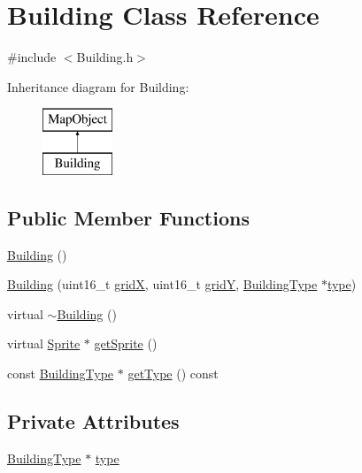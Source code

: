 \hypertarget{class_building}{}\section{Building Class Reference}
\label{class_building}


{\ttfamily \#include $<$Building.\+h$>$}

Inheritance diagram for Building\+:\begin{figure}[H]
\begin{center}
\leavevmode
\includegraphics[height=2.000000cm]{d2/dbd/class_building}
\end{center}
\end{figure}
\subsection*{Public Member Functions}
\begin{DoxyCompactItemize}
\item 
\hyperlink{class_building_ab570ec0a203ee621f9f522c678a147d9}{Building} ()
\item 
\hyperlink{class_building_acd27fcb248c0a2d7b4744c937877ba01}{Building} (uint16\+\_\+t \hyperlink{class_map_object_a48d8e19188fd7ae1b74d2de47d546209}{gridX}, uint16\+\_\+t \hyperlink{class_map_object_a0d3a76d4816097941bbfb5208b81cab6}{gridY}, \hyperlink{class_building_type}{Building\+Type} $\ast$\hyperlink{class_building_a523cec1e5e46e521a0f202ffb20f2b62}{type})
\item 
virtual \hyperlink{class_building_ab675c6a382e110b84031956cda708439}{$\sim$\+Building} ()
\item 
virtual \hyperlink{class_sprite}{Sprite} $\ast$ \hyperlink{class_building_a2ae5faae2dec5d1fda5538ea08228c0d}{get\+Sprite} ()
\item 
const \hyperlink{class_building_type}{Building\+Type} $\ast$ \hyperlink{class_building_a7e9f74497ce2598a9f2075284a723c9a}{get\+Type} () const
\end{DoxyCompactItemize}
\subsection*{Private Attributes}
\begin{DoxyCompactItemize}
\item 
\hyperlink{class_building_type}{Building\+Type} $\ast$ \hyperlink{class_building_a523cec1e5e46e521a0f202ffb20f2b62}{type}
\end{DoxyCompactItemize}
